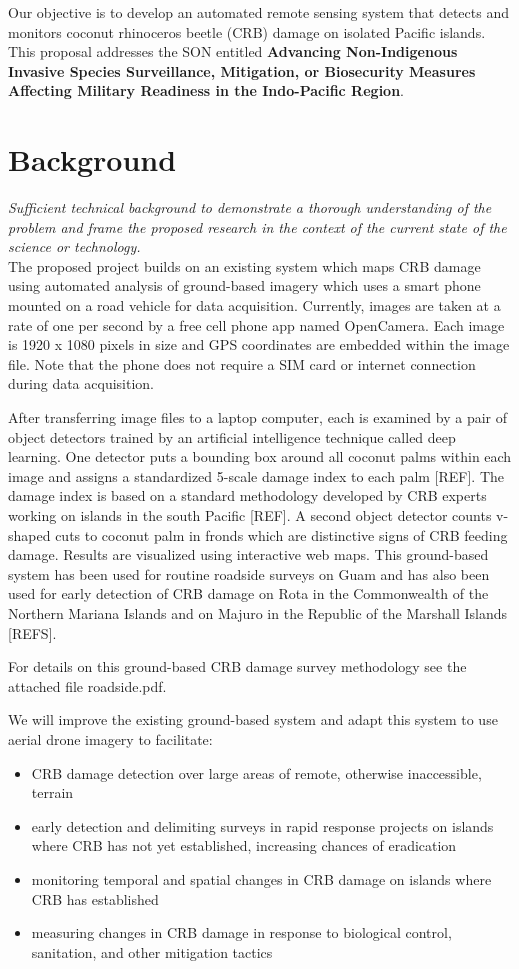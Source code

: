 \documentclass[11pt,letterpaper,english,bibliography=totocnumbered, abstract=on]{scrartcl}
\begin{document}
Our objective is to develop an automated remote sensing system that detects and monitors coconut rhinoceros beetle (CRB) damage on isolated Pacific islands. This proposal addresses the SON entitled \textbf{Advancing Non-Indigenous Invasive Species Surveillance, Mitigation, or Biosecurity Measures Affecting Military Readiness in the Indo-Pacific Region}.

	
\section{Background}

\textit{Sufficient technical background to demonstrate a thorough understanding of the problem and frame the proposed research in the context of the current state of the
science or technology.}\\

The proposed project builds on an existing system which maps CRB damage using automated analysis of ground-based imagery which uses a smart phone mounted on a road vehicle for data acquisition. Currently, images are taken at a rate of one per second by a free cell phone app named OpenCamera. Each image is 1920 x 1080 pixels in size and GPS coordinates are embedded within the image file. Note that the phone does not require a SIM card or internet connection during data acquisition. 

After transferring image files to a laptop computer, each is examined by a pair of object detectors trained by an artificial intelligence technique called deep learning. One detector puts a bounding box around all coconut palms within each image and assigns a standardized 5-scale damage index to each palm [REF]. The damage index is based on a standard methodology developed by CRB experts working on islands in the south Pacific [REF]. A second object detector counts v-shaped cuts to coconut palm in fronds which are distinctive signs of CRB feeding damage. Results are visualized using interactive web maps. This ground-based system has been used for routine roadside surveys on Guam and has also been used for early detection of CRB damage on Rota in the Commonwealth of the Northern Mariana Islands and on Majuro in the Republic of the Marshall Islands [REFS].

For details on this ground-based CRB damage survey methodology see the attached file roadside.pdf.

We will improve the existing ground-based system and adapt this system to use aerial drone imagery to facilitate:
\begin{itemize}
	\item CRB damage detection over large areas of remote, otherwise inaccessible, terrain
	\item early detection and delimiting surveys in rapid response projects on islands where CRB has not yet established, increasing chances of eradication
	\item monitoring temporal and spatial changes in CRB damage on islands where CRB has	established
	\item measuring changes in CRB damage in response to biological control, sanitation, and other mitigation tactics
\end{itemize}
\end{document}
